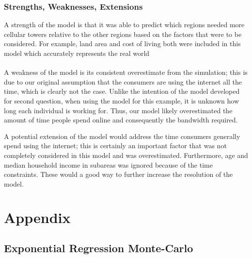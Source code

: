 \documentclass[12pt]{article}
\begin{document}
\subsubsection{Strengths, Weaknesses, Extensions}

A strength of the model is that it was able to predict which regions needed more cellular towers relative to the other regions based on the factors that were to be considered. For example, land area and cost of living both were included in this model which accurately represents the real world
\\
\\
A weakness of the model is its consistent overestimate from the simulation; this is due to our original assumption that the consumers are using the internet all the time, which is clearly not the case. Unlike the intention of the model developed for second question, when using the model for this example, it is unknown how long each individual is working for. Thus, our model likely overestimated the amount of time people spend online and consequently the bandwidth required.

A potential extension of the model would address the time consumers generally spend using the internet; this is certainly an important factor that was not completely considered in this model and was overestimated. Furthermore, age and median household income in subareas was ignored because of the time constraints. These would a good way to further increase the resolution of the model.

\pagebreak
\section{Appendix}

\subsection{Exponential Regression Monte-Carlo}
\end{document}
